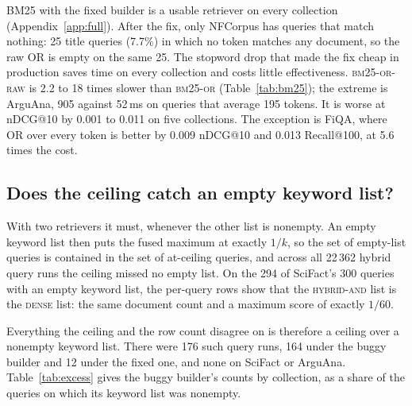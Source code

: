 \documentclass[11pt]{article}
\begin{document}
BM25 with the fixed builder is a usable retriever on every collection (Appendix~\ref{app:full}). After the fix, only NFCorpus has queries that match nothing: 25 title queries (7.7\%) in which no token matches any document, so the raw OR is empty on the same 25. The stopword drop that made the fix cheap in production saves time on every collection and costs little effectiveness. \textsc{bm25-or-raw} is 2.2 to 18 times slower than \textsc{bm25-or} (Table~\ref{tab:bm25}); the extreme is ArguAna, 905 against 52\,ms on queries that average 195 tokens. It is worse at nDCG@10 by 0.001 to 0.011 on five collections. The exception is FiQA, where OR over every token is better by 0.009 nDCG@10 and 0.013 Recall@100, at 5.6 times the cost.

\subsection{Does the ceiling catch an empty keyword list?}
\label{sec:rowcount}

With two retrievers it must, whenever the other list is nonempty. An empty keyword list then puts the fused maximum at exactly $1/k$, so the set of empty-list queries is contained in the set of at-ceiling queries, and across all 22\,362 hybrid query runs the ceiling missed no empty list. On the 294 of SciFact's 300 queries with an empty keyword list, the per-query rows show that the \textsc{hybrid-and} list is the \textsc{dense} list: the same document count and a maximum score of exactly $1/60$.

Everything the ceiling and the row count disagree on is therefore a ceiling over a nonempty keyword list. There were 176 such query runs, 164 under the buggy builder and 12 under the fixed one, and none on SciFact or ArguAna. Table~\ref{tab:excess} gives the buggy builder's counts by collection, as a share of the queries on which its keyword list was nonempty.
\end{document}
